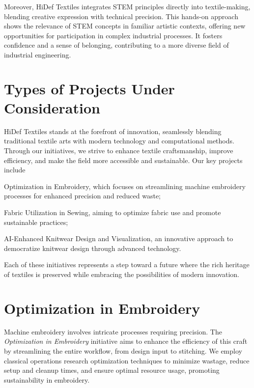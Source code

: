 \documentclass{article}
\begin{document}
    Moreover, HiDef Textiles integrates STEM principles directly into textile-making, blending creative expression
    with technical precision. This hands-on approach shows the relevance of STEM concepts in familiar artistic
    contexts, offering new opportunities for participation in complex industrial processes. It fosters confidence and
    a sense of belonging, contributing to a more diverse field of industrial engineering.


    \section{Types of Projects Under Consideration}

    HiDef Textiles stands at the forefront of innovation, seamlessly blending traditional textile arts with modern
    technology and computational methods. Through our initiatives, we strive to enhance textile craftsmanship, improve
    efficiency, and make the field more accessible and sustainable. Our key projects include
    \begin{enumerate*}
        \item Optimization in Embroidery, which focuses on streamlining machine embroidery processes for enhanced precision
        and reduced waste;
        \item Fabric Utilization in Sewing, aiming to optimize fabric use and promote sustainable practices;
        \item AI-Enhanced Knitwear Design and Visualization, an innovative approach to democratize knitwear design
        through advanced technology.
    \end{enumerate*}
    Each of these initiatives represents a step toward a future where the rich heritage of textiles is preserved
    while embracing the possibilities of modern innovation.


    \section{Optimization in Embroidery}

    Machine embroidery involves intricate processes requiring precision. The \emph{Optimization in Embroidery}
    initiative aims to enhance the efficiency of this craft by streamlining the entire workflow, from design input
    to stitching.
    We employ classical operations research optimization techniques to minimize wastage, reduce setup and cleanup times,
    and ensure optimal resource usage, promoting sustainability in embroidery.
\end{document}
